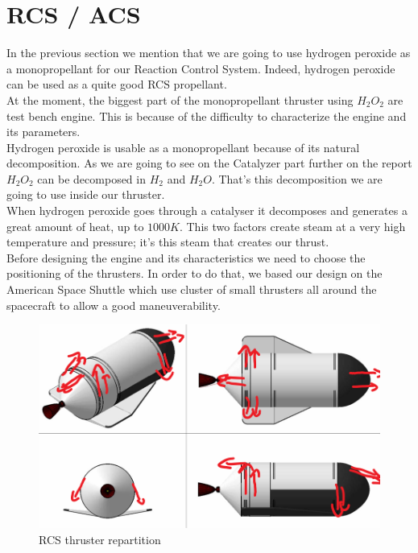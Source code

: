 \section{RCS / ACS}

In the previous section we mention that we are going to use hydrogen peroxide as a monopropellant for our Reaction Control System. Indeed, hydrogen peroxide can be used as a quite good RCS propellant. \\

At the moment, the biggest part of the monopropellant thruster using $H_2O_2$ are test bench engine. This is because of the difficulty to characterize the engine and its parameters. \\

Hydrogen peroxide is usable as a monopropellant because of its natural decomposition. As we are going to see on the Catalyzer part further on the report $H_2O_2$ can be decomposed in $H_2$ and $H_2O$. That's this decomposition we are going to use inside our thruster. \\
When hydrogen peroxide goes through a catalyser it decomposes and generates a great amount of heat, up to $1000K$. This two factors create steam at a very high temperature and pressure; it's this steam that creates our thrust.\\

Before designing the engine and its characteristics we need to choose the positioning of the thrusters. In order to do that, we based our design on the American Space Shuttle which use cluster of small thrusters all around the spacecraft to allow a good maneuverability.  

\begin{figure}[H]
    \centering
    \includegraphics[width=\linewidth]{shiprcs}
    \caption{RCS thruster repartition}
\end{figure}

